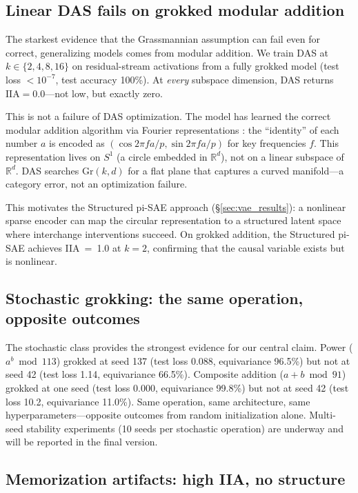 \documentclass{article}
\newcommand{\Gr}{\mathrm{Gr}}
\newcommand{\IIA}{\mathrm{IIA}}
\newcommand{\R}{\mathbb{R}}
\begin{document}
\subsection{Linear DAS fails on grokked modular addition}
\label{sec:linear_das_fails}

The starkest evidence that the Grassmannian assumption can fail even for correct,
generalizing models comes from modular addition. We train DAS at
$k \in \{2, 4, 8, 16\}$ on residual-stream activations from a fully grokked
model (test loss $< 10^{-7}$, test accuracy 100\%). At \emph{every} subspace
dimension, DAS returns $\IIA = 0.0$---not low, but exactly zero.

This is not a failure of DAS optimization. The model has learned the correct
modular addition algorithm via Fourier representations \citep{nanda2023progress}:
the ``identity'' of each number $a$ is encoded as
$(\cos 2\pi f a / p, \sin 2\pi f a / p)$ for key frequencies $f$. This
representation lives on $S^1$ (a circle embedded in $\R^d$), not on a linear
subspace of $\R^d$. DAS searches $\Gr(k,d)$ for a flat plane that captures a
curved manifold---a category error, not an optimization failure.

This motivates the Structured pi-SAE approach (\S\ref{sec:vae_results}):
a nonlinear sparse encoder can map the circular representation to a structured
latent space where interchange interventions succeed. On grokked addition, the
Structured pi-SAE achieves IIA~=~1.0 at $k{=}2$, confirming that the causal
variable exists but is nonlinear.

\subsection{Stochastic grokking: the same operation, opposite outcomes}
\label{sec:stochastic}

The stochastic class provides the strongest evidence for our central claim.
Power ($a^b \bmod 113$) grokked at seed 137 (test loss 0.088, equivariance
96.5\%) but not at seed 42 (test loss 1.14, equivariance 66.5\%). Composite
addition ($a + b \bmod 91$) grokked at one seed (test loss 0.000, equivariance
99.8\%) but not at seed 42 (test loss 10.2, equivariance 11.0\%). Same
operation, same architecture, same hyperparameters---opposite outcomes from
random initialization alone. Multi-seed stability experiments (10 seeds per
stochastic operation) are underway and will be reported in the final version.

\subsection{Memorization artifacts: high IIA, no structure}
\label{sec:memorization}
\end{document}

